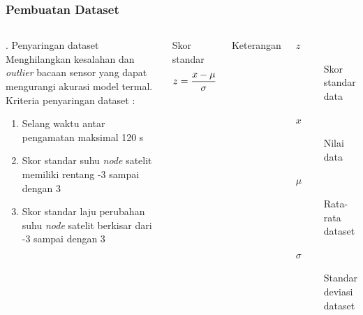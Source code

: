 \documentclass[8pt]{beamer}
\begin{document}
\begin{frame}
  \frametitle{Pembuatan Dataset}
  \begin{columns}[T]
      \begin{block}{. Penyaringan dataset}
        Menghilangkan kesalahan dan \textit{outlier} bacaan sensor yang dapat mengurangi akurasi model termal.
      Kriteria penyaringan dataset :
\begin{enumerate}
\item Selang waktu antar pengamatan maksimal 120 s 
\item Skor standar suhu \textit{node} satelit memiliki rentang -3 sampai dengan 3
\item Skor standar laju perubahan suhu \textit{node} satelit berkisar dari -3 sampai dengan 3 
\end{enumerate}
      \end{block}
      \begin{block}{\center Skor standar}
\begin{equation}
\label{eq:zscore}
\small
	z = \frac{x - \mu}{\sigma}
\end{equation}
      \end{block}
      \small
\center Keterangan \cite{massaron}

    \begin{description}
        \item[$z$] Skor standar data
        \item[$x$] Nilai data
        \item[$\mu$] Rata-rata dataset
        \item[$\sigma$] Standar deviasi dataset
    \end{description}
  \end{columns}
\end{frame}
\end{document}
